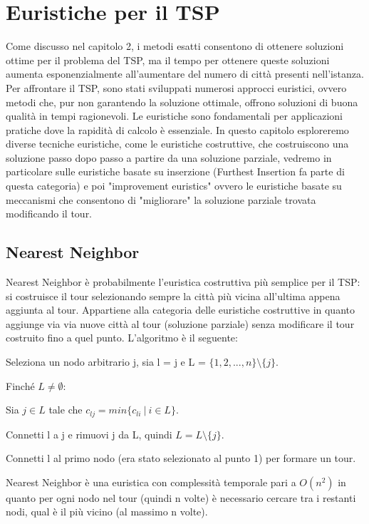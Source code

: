 \documentclass[a4paper,12pt]{report}
\begin{document}
\chapter{Euristiche per il TSP}
Come discusso nel capitolo 2, i metodi esatti consentono di ottenere soluzioni ottime per il problema del TSP, ma il tempo per ottenere queste soluzioni aumenta esponenzialmente all'aumentare del numero di città presenti nell'istanza. Per affrontare il TSP, sono stati sviluppati numerosi approcci euristici, ovvero metodi che, pur non garantendo la soluzione ottimale, offrono soluzioni di buona qualità in tempi ragionevoli. Le euristiche sono fondamentali per applicazioni pratiche dove la rapidità di calcolo è essenziale. In questo capitolo esploreremo diverse tecniche euristiche, come le euristiche costruttive, che costruiscono una soluzione passo dopo passo a partire da una soluzione parziale, vedremo in particolare sulle euristiche basate su inserzione (Furthest Insertion fa parte di questa categoria) e poi "improvement euristics" ovvero le euristiche basate su meccanismi che consentono di "migliorare" la soluzione parziale trovata modificando il tour.
\section{Nearest Neighbor}
Nearest Neighbor è probabilmente l'euristica costruttiva più semplice per il TSP: si costruisce il tour selezionando sempre la città più vicina all'ultima appena aggiunta al tour. Appartiene alla categoria delle euristiche costruttive in quanto aggiunge via via nuove città al tour (soluzione parziale) senza modificare il tour costruito fino a quel punto. L'algoritmo è il seguente:

\begin{tcolorbox}[colframe=black,colback=white,boxrule=0.5pt, sharp corners]
\begin{legal}
  \item Seleziona un nodo arbitrario j, sia l = j e L = $\{1, 2, ..., n\} \setminus \{j\}$.
  \item Finché $L \neq \emptyset$:
  \begin{legal}
    \item Sia $j \in L$ tale che $c_{lj} = min\{c_{li} \  | \  i \in L\}$.
    \item Connetti l a j e rimuovi j da L, quindi $ L = L \setminus \{j\} $.
  \end{legal}
  \item Connetti l al primo nodo (era stato selezionato al punto 1) per formare un tour.
\end{legal}
\end{tcolorbox}
\hfill \break
Nearest Neighbor è una euristica con complessità temporale pari a $O(n^2)$ in quanto per ogni nodo nel tour (quindi n volte) è necessario cercare tra i restanti nodi, qual è il più vicino (al massimo n volte).
\end{document}
